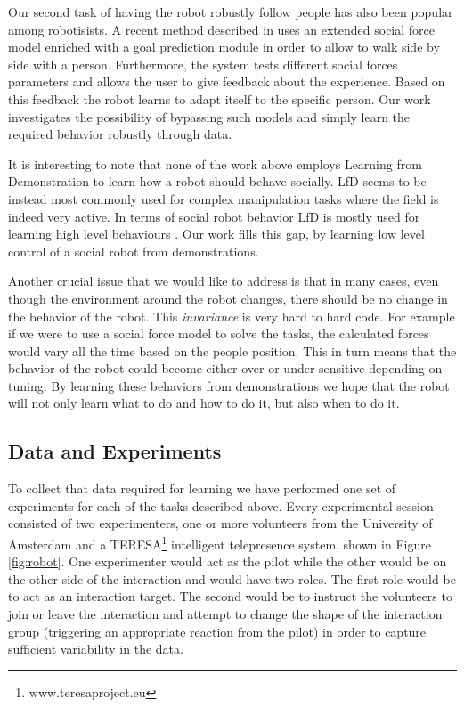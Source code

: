 \documentclass[letterpaper, 10 pt, conference]{ieeeconf}
\begin{document}
Our second task of having the robot robustly follow people has also been popular among robotisists. A recent method described in \cite{ferrer2016robot} uses an extended social force model enriched with a goal prediction module in order to allow to walk side by side with a person. Furthermore, the system tests different social forces parameters and allows the user to give feedback about the experience. Based on this feedback the robot learns to adapt itself to the specific person.  Our work investigates the possibility of bypassing such models and simply learn the required behavior robustly through data.  

It is interesting to note that none of the work above employs Learning from Demonstration to learn how a robot should behave socially. LfD seems to be instead most commonly used for complex manipulation tasks \cite{argall2009survey} where the field is indeed very active. In terms of social robot behavior LfD is mostly used for learning high level behaviours . Our work fills this gap, by learning low level control of a social robot  from demonstrations.

Another crucial issue that we would like to address is that in many cases, even though the environment around the robot changes, there should be no change in the behavior of the robot. This \emph{invariance} is very hard to hard code. For example if we were to use a social force model to solve the tasks, the calculated forces would vary all the time based on the people position. This in turn means that the behavior of the robot could become either over or under sensitive depending on tuning. By learning these behaviors from demonstrations we hope that the robot will not only learn what to do and how to do it, but also when to do it.


\subsection{Data and Experiments \label{subsec:data_exp}} 

To collect that data required for learning we have performed one set of experiments for each of the tasks described above. Every experimental session consisted of two experimenters, one or more volunteers from the University of Amsterdam and a TERESA\footnote{www.teresaproject.eu} intelligent telepresence system, shown in Figure \ref{fig:robot}.  One experimenter would act as the pilot while the other would be on the other side of the interaction and would have two roles. The first role would be to act as an interaction target. The second would be to instruct the volunteers to join or leave the interaction and attempt to change the shape of the interaction group (triggering an appropriate reaction from the pilot) in order to capture sufficient variability in the data.  
\end{document}
